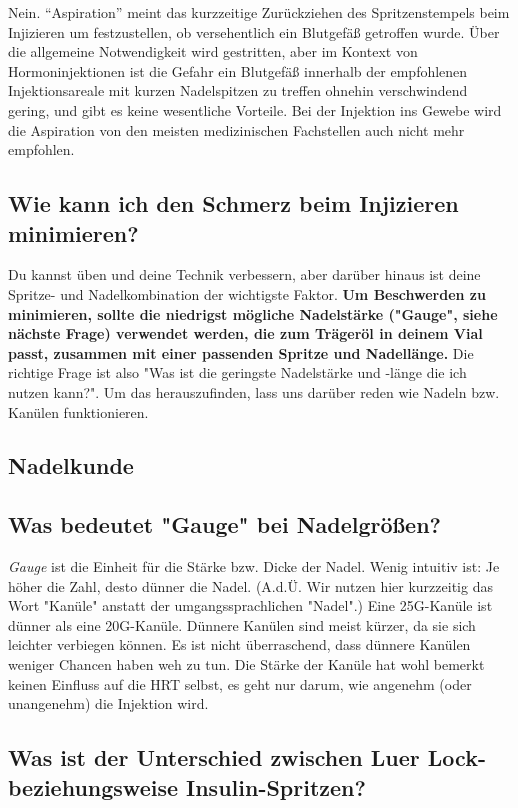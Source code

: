 \documentclass{article}
\begin{document}
Nein. “Aspiration” meint das kurzzeitige Zurückziehen des Spritzenstempels beim Injizieren um festzustellen, ob versehentlich ein Blutgefäß getroffen wurde. Über die allgemeine Notwendigkeit wird gestritten, aber im Kontext von Hormoninjektionen ist die Gefahr ein Blutgefäß innerhalb der empfohlenen Injektionsareale mit kurzen Nadelspitzen zu treffen ohnehin verschwindend gering, und gibt es keine wesentliche Vorteile. Bei der Injektion ins Gewebe wird die Aspiration von den meisten medizinischen Fachstellen auch nicht mehr empfohlen.

\subsection{Wie kann ich den Schmerz beim Injizieren minimieren?}

Du kannst üben und deine Technik verbessern, aber darüber hinaus ist deine Spritze- und Nadelkombination der wichtigste Faktor. \textbf{Um Beschwerden zu minimieren, sollte die niedrigst mögliche Nadelstärke ("Gauge", siehe nächste Frage) verwendet werden, die zum Trägeröl in deinem Vial passt, zusammen mit einer passenden Spritze und Nadellänge. }Die richtige Frage ist also "Was ist die geringste Nadelstärke und -länge die ich nutzen kann?". Um das herauszufinden, lass uns darüber reden wie Nadeln bzw. Kanülen funktionieren.

\subsection*{Nadelkunde}

\subsection{Was bedeutet "Gauge" bei Nadelgrößen?}

\textit{Gauge }ist die Einheit für die Stärke bzw. Dicke der Nadel. Wenig intuitiv ist: Je höher die Zahl, desto dünner die Nadel. (A.d.Ü. Wir nutzen hier kurzzeitig das Wort "Kanüle" anstatt der umgangssprachlichen "Nadel".) Eine 25G-Kanüle ist dünner als eine 20G-Kanüle. Dünnere Kanülen sind meist kürzer, da sie sich leichter verbiegen können. Es ist nicht überraschend, dass dünnere Kanülen weniger Chancen haben weh zu tun. Die Stärke der Kanüle hat wohl bemerkt keinen Einfluss auf die HRT selbst, es geht nur darum, wie angenehm (oder unangenehm) die Injektion wird.

\subsection{Was ist der Unterschied zwischen Luer Lock- beziehungsweise Insulin-Spritzen?}\label{5-13}
\end{document}
